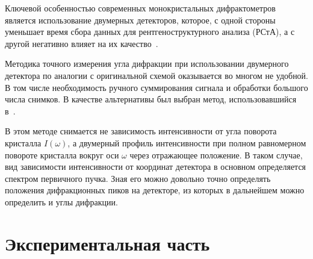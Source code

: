 \documentclass[a4paper,14pt]{extarticle}
\begin{document}
Ключевой особенностью современных монокристальных дифрактометров является использование двумерных детекторов, которое, с одной стороны уменьшает время сбора данных для рентгеноструктурного анализа (РСтА), а с другой негативно влияет на их качество~\cite{Dudka:2017}.

Методика точного измерения угла дифракции при использовании двумерного детектора по аналогии с оригинальной схемой оказывается во многом не удобной.
В том числе необходимость ручного суммирования сигнала и обработки большого числа снимков.
В качестве альтернативы был выбран метод, использовавшийся в~\cite{Serebrennikova:2021}.

В этом методе снимается не зависимость интенсивности от угла поворота кристалла $I(\omega)$, а двумерный профиль интенсивности при полном равномерном повороте кристалла вокруг оси $\omega$ через отражающее положение.
В таком случае, вид зависимости интенсивности от координат детектора в основном определяется спектром первичного пучка.
Зная его можно довольно точно определять положения дифракционных пиков на детекторе, из которых в дальнейшем можно определить и углы дифракции.
\section{Экспериментальная часть}
\end{document}
